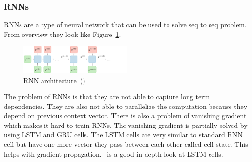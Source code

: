 \documentclass{article}
\begin{document}
    \subsubsection{RNNs}
    RNNs are a type of neural network that can be used to solve seq to seq problem.
    From overview they look like Figure~\ref{fig:rnn}.
    \begin{figure}[h!]
        \centering
        \includegraphics[width=0.5\textwidth]{architecture-rnn-ltr.png}
        \caption{RNN architecture~(\cite{CS230Recurrent})}
        \label{fig:rnn}
    \end{figure}
    
    The problem of RNNs is that they are not able to capture long term dependencies.
    They are also not able to parallelize the computation because they depend on previous context vector.
    There is also a problem of vanishing gradient which makes it hard to train RNNs.
    The vanishing gradient is partially solved by using LSTM and GRU cells.
    The LSTM cells are very similar to standard RNN cell but have one more vector they pass between each other called cell state.
    This helps with gradient propagation.~\cite{staudemeyerUnderstandingLSTMTutorial2019} is a good in-depth look at LSTM cells.

    
\end{document}
